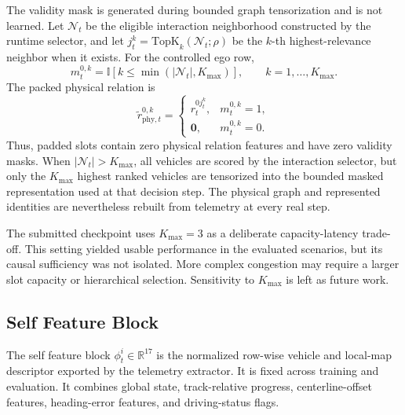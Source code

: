 \documentclass[journal]{IEEEtran}
\begin{document}
The validity mask is generated during bounded graph tensorization and is not
learned. Let $\mathcal{N}_t$ be the eligible interaction neighborhood
constructed by the runtime selector, and let
$j_t^k=\mathrm{TopK}_k(\mathcal{N}_t;\rho)$ be the $k$-th
highest-relevance neighbor when it exists. For the controlled ego row,
\begin{equation}
m_t^{0,k}
=
\mathbb{I}
[
k\le \min(|\mathcal{N}_t|,K_{\max})
],
\qquad
k=1,\ldots,K_{\max}.
\end{equation}
The packed physical relation is
\begin{equation}
\tilde r_{\mathrm{phy},t}^{0,k}
=
\begin{cases}
r_t^{0j_t^k}, & m_t^{0,k}=1,\\
\mathbf{0}, & m_t^{0,k}=0.
\end{cases}
\end{equation}
Thus, padded slots contain zero physical relation features and have
zero validity masks. When $|\mathcal{N}_t|>K_{\max}$, all vehicles are
scored by the interaction selector, but only the $K_{\max}$ highest
ranked vehicles are tensorized into the bounded masked representation
used at that decision step. The physical graph and represented
identities are nevertheless rebuilt from telemetry at every real step.

The submitted checkpoint uses $K_{\max}=3$ as a deliberate
capacity-latency trade-off. This setting yielded usable performance in
the evaluated scenarios, but its causal sufficiency was not isolated.
More complex congestion may require a larger slot capacity or
hierarchical selection. Sensitivity to $K_{\max}$ is left as future
work.

\subsection{Self Feature Block}
\label{supp:self_feature}

The self feature block $\phi_t^i\in\mathbb{R}^{17}$ is the normalized
row-wise vehicle and local-map descriptor exported by the telemetry
extractor. It is fixed across training and evaluation. It combines
global state, track-relative progress, centerline-offset features,
heading-error features, and driving-status flags.
\end{document}
